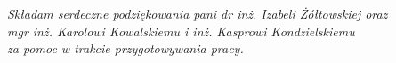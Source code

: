 \newpage
\thispagestyle{empty}
\begin{flushright}
\textit{
Składam serdeczne podziękowania pani dr inż. Izabeli Żółtowskiej oraz\\
mgr inż. Karolowi Kowalskiemu i inż. Kasprowi Kondzielskiemu \\
za pomoc w trakcie przygotowywania pracy.
}
\end{flushright}
\cleardoublepage

